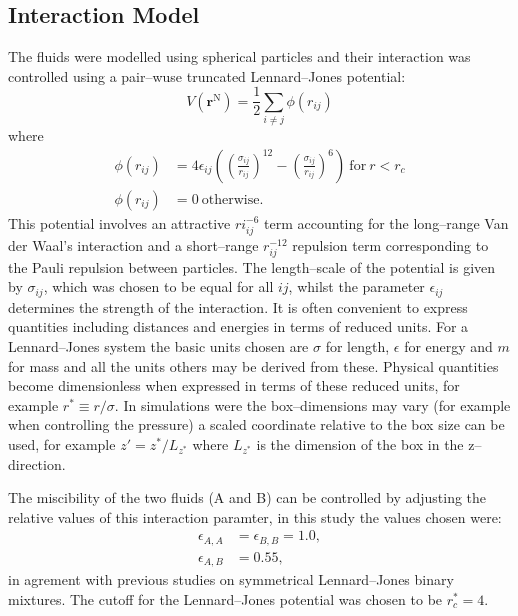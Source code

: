 \subsection{Interaction Model}\label{InteractionModel}
The fluids were modelled using spherical particles and their interaction was controlled using a pair--wuse truncated Lennard--Jones potential:
\begin{equation}
V \left( \mathbf{r}^{\mathrm{N}} \right) = \frac{1}{2} \sum_{i\neq j} \phi \left( r_{ij} \right)
\end{equation}
where
\begin{align}
\label{LJ}
\phi \left( r_{ij} \right) &= 4 \epsilon_{ij} \left( \left( \frac{\sigma_{ij}}{r_{ij}}\right)^{12} - \left( \frac{\sigma_{ij}}{r_{ij}}\right)^{6} \right)\ \mathrm{for}\ r < r_{c}\\
\phi \left( r_{ij} \right) &= 0\ \mathrm{otherwise}.
\end{align}
This potential involves an attractive $ri_{ij}^{-6}$ term accounting for the long--range Van der Waal's interaction and a short--range $r_{ij}^{-12}$ repulsion term corresponding to the Pauli repulsion between particles.
The length--scale of the potential is given by $\sigma_{ij}$, which was chosen to be equal for all $ij$, whilst the parameter $\epsilon_{ij}$ determines the strength of the interaction. 
It is often convenient to express quantities including distances and energies in terms of reduced units.
For a Lennard--Jones system the basic units chosen are $\sigma$ for length, $\epsilon$ for energy and $m$ for mass and all the units others may be derived from these.\cite{FrenkelSmit}
Physical quantities become dimensionless when expressed in terms of these reduced units, for example $r^{*} \equiv r / \sigma$.
In simulations were the box--dimensions may vary (for example when controlling the pressure) a scaled coordinate relative to the box size can be used, for example $z' = z^{*} / L_{z^{*}}$ where $L_{z^{*}}$ is the dimension of the box in the z--direction. 

The miscibility of the two fluids (A and B) can be controlled by adjusting the relative values of this interaction paramter, in this study the values chosen were:
\begin{align}
\epsilon_{A,A} &= \epsilon_{B,B} = 1.0,\\
\epsilon_{A,B} &= 0.55,
\end{align}
in agrement with previous studies on symmetrical Lennard--Jones binary mixtures.\cite{MorenzoRazo,Blas,HolgerBoppHampe}
The cutoff for the Lennard--Jones potential was chosen to be $r_{c}^{*} = 4$.

